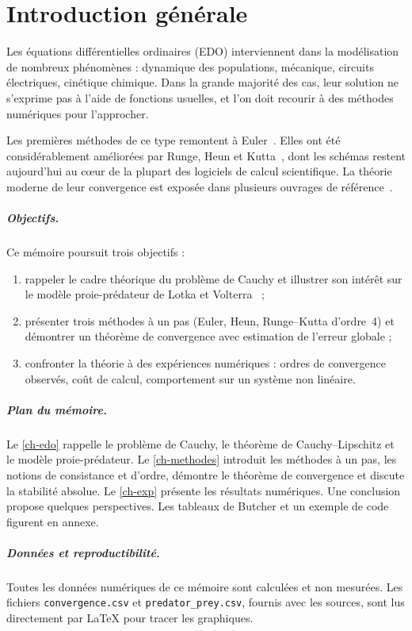 \chapter*{Introduction générale}

Les équations différentielles ordinaires (EDO) interviennent dans la modélisation de nombreux phénomènes : dynamique des populations, mécanique, circuits électriques, cinétique chimique. Dans la grande majorité des cas, leur solution ne s'exprime pas à l'aide de fonctions usuelles, et l'on doit recourir à des méthodes numériques pour l'approcher.

Les premières méthodes de ce type remontent à Euler~\cite{euler1768}. Elles ont été considérablement améliorées par Runge, Heun et Kutta~\cite{runge1895,heun1900,kutta1901}, dont les schémas restent aujourd'hui au c\oe ur de la plupart des logiciels de calcul scientifique. La théorie moderne de leur convergence est exposée dans plusieurs ouvrages de référence~\cite{hairer1993,butcher2016,suli2003,atkinson2009}.

\paragraph{Objectifs.}
Ce mémoire poursuit trois objectifs :
\begin{enumerate}[label=(\roman*),itemsep=2pt]
  \item rappeler le cadre théorique du problème de Cauchy et illustrer son intérêt sur le modèle proie-prédateur de Lotka et Volterra~\cite{lotka1925,volterra1926} ;
  \item présenter trois méthodes à un pas (Euler, Heun, Runge--Kutta d'ordre~4) et démontrer un théorème de convergence avec estimation de l'erreur globale ;
  \item confronter la théorie à des expériences numériques : ordres de convergence observés, coût de calcul, comportement sur un système non linéaire.
\end{enumerate}

\paragraph{Plan du mémoire.}
Le \cref{ch-edo} rappelle le problème de Cauchy, le théorème de Cauchy--Lipschitz et le modèle proie-prédateur. Le \cref{ch-methodes} introduit les méthodes à un pas, les notions de consistance et d'ordre, démontre le théorème de convergence et discute la stabilité absolue. Le \cref{ch-exp} présente les résultats numériques. Une conclusion propose quelques perspectives. Les tableaux de Butcher et un exemple de code figurent en annexe.

\paragraph{Données et reproductibilité.}
Toutes les données numériques de ce mémoire sont calculées et non mesurées. Les fichiers \texttt{convergence.csv} et \texttt{predator\_prey.csv}, fournis avec les sources, sont lus directement par \LaTeX{} pour tracer les graphiques.
